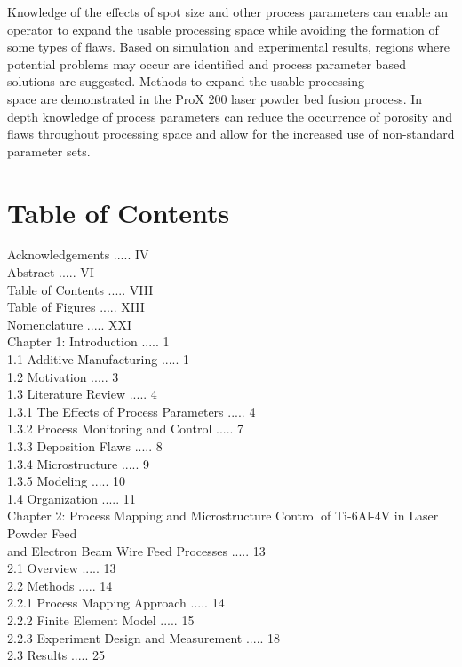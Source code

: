 \documentclass[10pt]{article}
\begin{document}
Knowledge of the effects of spot size and other process parameters can enable an operator to expand the usable processing space while avoiding the formation of some types of flaws. Based on simulation and experimental results, regions where potential problems may occur are identified and process parameter based solutions are suggested. Methods to expand the usable processing\\
space are demonstrated in the ProX 200 laser powder bed fusion process. In depth knowledge of process parameters can reduce the occurrence of porosity and flaws throughout processing space and allow for the increased use of non-standard parameter sets.

\section*{Table of Contents}
Acknowledgements ..... IV\\
Abstract ..... VI\\
Table of Contents ..... VIII\\
Table of Figures ..... XIII\\
Nomenclature ..... XXI\\
Chapter 1: Introduction ..... 1\\
1.1 Additive Manufacturing ..... 1\\
1.2 Motivation ..... 3\\
1.3 Literature Review ..... 4\\
1.3.1 The Effects of Process Parameters ..... 4\\
1.3.2 Process Monitoring and Control ..... 7\\
1.3.3 Deposition Flaws ..... 8\\
1.3.4 Microstructure ..... 9\\
1.3.5 Modeling ..... 10\\
1.4 Organization ..... 11\\
Chapter 2: Process Mapping and Microstructure Control of Ti-6Al-4V in Laser Powder Feed\\
and Electron Beam Wire Feed Processes ..... 13\\
2.1 Overview ..... 13\\
2.2 Methods ..... 14\\
2.2.1 Process Mapping Approach ..... 14\\
2.2.2 Finite Element Model ..... 15\\
2.2.3 Experiment Design and Measurement ..... 18\\
2.3 Results ..... 25\\
\end{document}
